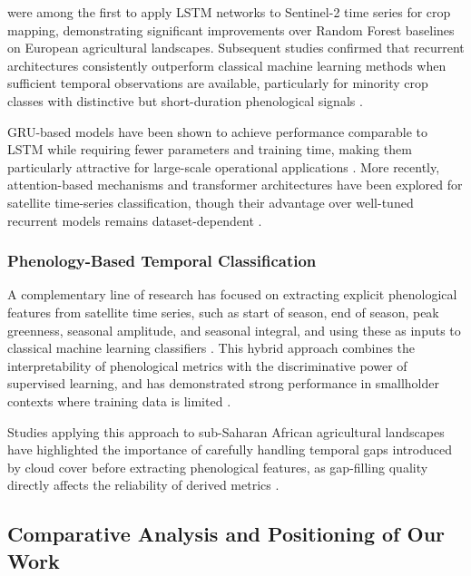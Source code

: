     \textcite{russwurm2017} were among the first to apply 
    LSTM networks to Sentinel-2 time series for crop 
    mapping, demonstrating significant improvements over 
    Random Forest baselines on European agricultural 
    landscapes. Subsequent studies confirmed that 
    recurrent architectures consistently outperform 
    classical machine learning methods when sufficient 
    temporal observations are available, particularly 
    for minority crop classes with distinctive but 
    short-duration phenological signals \cite{interdonato2019}.

    GRU-based models have been shown to achieve performance 
    comparable to LSTM while requiring fewer parameters 
    and training time, making them particularly attractive 
    for large-scale operational applications 
    \cite{cho2014}. More recently, attention-based 
    mechanisms and transformer architectures have 
    been explored for satellite time-series 
    classification, though their advantage over 
    well-tuned recurrent models remains dataset-dependent 
    \cite{garnot2020}.

    \subsubsection{Phenology-Based Temporal Classification}

    A complementary line of research has focused on 
    extracting explicit phenological features from 
    satellite time series, such as start of season, 
    end of season, peak greenness, seasonal amplitude, 
    and seasonal integral, and using these as inputs 
    to classical machine learning classifiers 
    \cite{inglada2016}. This hybrid approach combines 
    the interpretability of phenological metrics with 
    the discriminative power of supervised learning, 
    and has demonstrated strong performance in 
    smallholder contexts where training data is 
    limited \cite{defourny2019}.

    Studies applying this approach to sub-Saharan 
    African agricultural landscapes have highlighted 
    the importance of carefully handling temporal 
    gaps introduced by cloud cover before extracting 
    phenological features, as gap-filling quality 
    directly affects the reliability of derived 
    metrics \cite{rs2020rwanda}.

  \subsection{Comparative Analysis and Positioning of Our Work}

